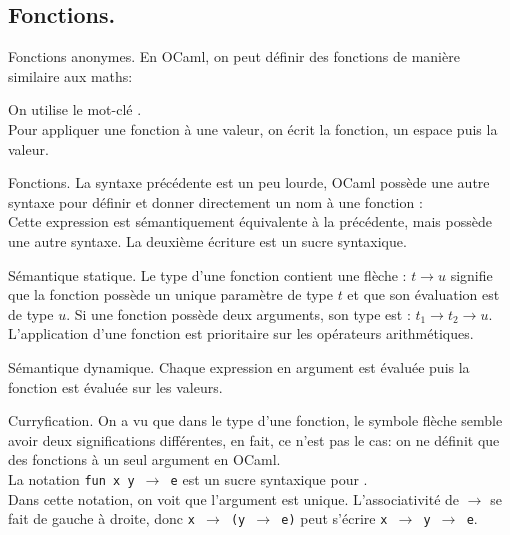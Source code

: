 \documentclass[french, 11pt]{article}
\begin{document}
\subsection{Fonctions.}

\begin{defi}{Fonctions anonymes.}{}
    En OCaml, on peut définir des fonctions de manière similaire aux maths:
    \begin{center}
    \end{center}
    On utilise le mot-clé .\\
    Pour appliquer une fonction à une valeur, on écrit la fonction, un espace puis la valeur.
\end{defi}

\begin{defi}{Fonctions.}{}
    La syntaxe précédente est un peu lourde, OCaml possède une autre syntaxe pour définir et donner directement un nom à une fonction : \\
    Cette expression est sémantiquement équivalente à la précédente, mais possède une autre syntaxe. La deuxième écriture est un sucre syntaxique.
\end{defi}

\begin{defi}{Sémantique statique.}{}
    Le type d'une fonction contient une flèche : $t \to u$ signifie que la fonction possède un unique paramètre de type $t$ et que son évaluation est de type $u$.\n
    Si une fonction possède deux arguments, son type est : $t_1\to t_2 \to u$.\\
    L'application d'une fonction est prioritaire sur les opérateurs arithmétiques.
\end{defi}

\begin{defi}{Sémantique dynamique.}{}
    Chaque expression en argument est évaluée puis la fonction est évaluée sur les valeurs.
\end{defi}

\begin{defi}{Curryfication.}{}
    On a vu que dans le type d'une fonction, le symbole flèche semble avoir deux significations différentes, en fait, ce n'est pas le cas: on ne définit que des fonctions à un seul argument en OCaml.\\
    La notation \texttt{fun x y $\to$ e} est un sucre syntaxique pour .\\
    Dans cette notation, on voit que l'argument est unique.\n
    L'associativité de $\to$ se fait de gauche à droite, donc \texttt{x $\to$ (y $\to$ e)} peut s'écrire \texttt{x $\to$ y $\to$ e}.
\end{defi}
\end{document}
